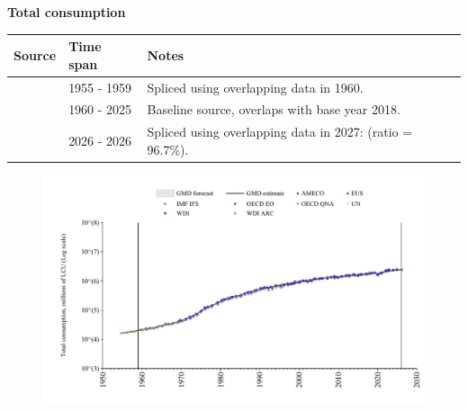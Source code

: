 \documentclass[12pt,a4paper,landscape]{article}
\begin{document}
\begin{adjustbox}{max totalsize={\paperwidth}{\paperheight},center}
\begin{minipage}[t][\textheight][t]{\textwidth}
\vspace*{0.5cm}
{}
\begin{center}
{\Large\bfseries Total consumption}
\end{center}
\vspace{0.5cm}
\begin{table}[H]
\centering
\small
\begin{tabular}{|l|l|l|}
\hline
\textbf{Source} & \textbf{Time span} & \textbf{Notes} \\
\hline
\rowcolor{white}\cite{OECD_QNA}& 1955 - 1959 &Spliced using overlapping data in 1960. \\
\rowcolor{lightgray}\cite{OECD_EO}& 1960 - 2025 &Baseline source, overlaps with base year 2018. \\
\rowcolor{white}\cite{AMECO}& 2026 - 2026 &Spliced using overlapping data in 2027: (ratio = 96.7\%). \\
\hline
\end{tabular}
\end{table}
\begin{figure}[H]
\centering
\includegraphics[width=\textwidth,height=0.6\textheight,keepaspectratio]{graphs/GBR_cons.pdf}
\end{figure}
\end{minipage}
\end{adjustbox}
\end{document}
